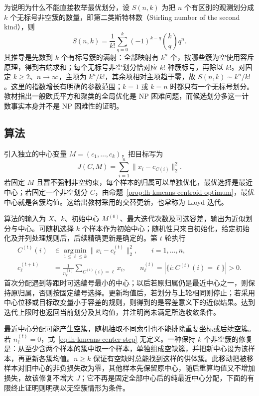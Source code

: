 为说明为什么不能直接枚举最优划分，设 $S(n,k)$ 为把 $n$ 个有区别的观测划分成 $k$ 个无标号非空簇的数量，即第二类斯特林数（Stirling number of the second kind），则
\begin{equation}
S(n,k)=\frac1{k!}\sum_{q=0}^k(-1)^{k-q}\binom{k}{q}q^n.
\label{eq:lh-kmeans-stirling}
\end{equation}
其推导是先数到 $k$ 个有标号簇的满射：全部映射有 $k^n$ 个，按哪些簇为空使用容斥原理，得到右端求和；每个无标号非空划分恰对应 $k!$ 种簇标号，再除以 $k!$。对固定 $k\geq2$、$n\to\infty$，主项为 $k^n/k!$，其余项相对主项趋于零，故 $S(n,k)\sim k^n/k!$。这里的指数增长有明确的参数范围；$k=1$ 或 $k=n$ 时都只有一个无标号划分。教材指出一般欧氏平方和聚类的全局优化是 NP 困难问题，而候选划分多这一计数事实本身并不是 NP 困难性的证明。

\subsection{算法}
\label{subsec:lh-kmeans-algorithm}

引入独立的中心变量 $M=(c_1,\ldots,c_k)$，把目标写为
\begin{equation}
J(C,M)=\sum_{i=1}^n\|x_i-c_{C(i)}\|_2^2.
\label{eq:lh-kmeans-joint-objective}
\end{equation}
若固定 $M$ 且暂不强制非空约束，每个样本的归属可以单独优化，最优选择是最近中心；若固定一个非空划分 $C$，由命题~\ref{prop:lh-kmeans-centroid-optimum}，最优中心就是各簇均值。这给出教材采用的交替更新，也常称为 Lloyd 迭代。

算法的输入为 $X$、$k$、初始中心 $M^{(0)}$、最大迭代次数及可选容差，输出为近似划分与中心。可随机选择 $k$ 个样本作为初始中心；随机性只来自初始化，给定初始化及并列处理规则后，后续精确更新是确定的。第 $t$ 轮执行
\begin{align}
C^{(t)}(i)&\in\operatorname*{arg\,min}_{1\leq\ell\leq k}
\|x_i-c_\ell^{(t)}\|_2^2,\qquad i=1,\ldots,n,
\label{eq:lh-kmeans-assignment-step}\\
c_\ell^{(t+1)}&=\frac1{n_\ell^{(t)}}\sum_{C^{(t)}(i)=\ell}x_i,
\qquad n_\ell^{(t)}=|\{i:C^{(t)}(i)=\ell\}|>0.
\label{eq:lh-kmeans-center-step}
\end{align}
首次分配遇到等距时可选编号最小的中心；以后若原归属仍是最近中心之一，则保持原归属，否则按固定编号选择。更新均值后，若划分与上轮相同则停止；若采用中心位移或目标改变量小于容差的规则，则得到的是容差意义下的近似结果。达到迭代上限时也返回当前划分及其均值，并注明尚未满足所选收敛条件。

\begin{notealert}[type=caution,title={空簇必须单独处理}]
最近中心分配可能产生空簇，随机抽取不同索引也不能排除重复坐标或后续空簇。若 $n_\ell^{(t)}=0$，式~\eqref{eq:lh-kmeans-center-step} 无定义。一种保持 $k$ 个非空簇的修复是：从至少含两个样本的簇中取一个样本，单独组成空缺簇，并把新中心设为该样本，再更新各簇均值。$n\geq k$ 保证有空缺时总能找到这样的供体簇。此移动把被移样本对旧中心的非负损失改为零，其他样本先保留原中心，随后重算均值又不增加损失，故该修复不增大 $J$；它不再是固定全部中心后的纯最近中心分配，下面的有限终止证明则明确以无空簇情形为条件。
\end{notealert}

